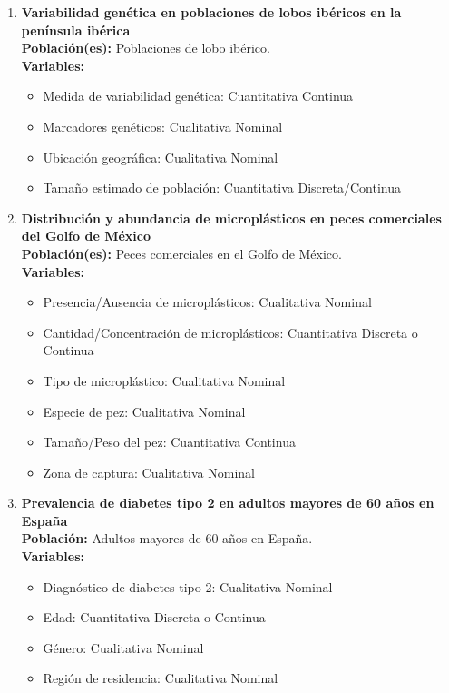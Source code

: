 \documentclass[12pt, letterpaper]{article}
\begin{document}
\begin{enumerate}
\item \textbf{Variabilidad genética en poblaciones de lobos ibéricos en la península ibérica} \\ 
\textbf{Población(es):} Poblaciones de lobo ibérico. \\ 
\textbf{Variables:}
\begin{itemize}
  \item Medida de variabilidad genética: Cuantitativa Continua
  \item Marcadores genéticos: Cualitativa Nominal
  \item Ubicación geográfica: Cualitativa Nominal
  \item Tamaño estimado de población: Cuantitativa Discreta/Continua
\end{itemize}

\item \textbf{Distribución y abundancia de microplásticos en peces comerciales del Golfo de México} \\ 
\textbf{Población(es):} Peces comerciales en el Golfo de México. \\ 
\textbf{Variables:}
\begin{itemize}
  \item Presencia/Ausencia de microplásticos: Cualitativa Nominal
  \item Cantidad/Concentración de microplásticos: Cuantitativa Discreta o Continua
  \item Tipo de microplástico: Cualitativa Nominal
  \item Especie de pez: Cualitativa Nominal
  \item Tamaño/Peso del pez: Cuantitativa Continua
  \item Zona de captura: Cualitativa Nominal
\end{itemize}

\item \textbf{Prevalencia de diabetes tipo 2 en adultos mayores de 60 años en España} \\ 
\textbf{Población:} Adultos mayores de 60 años en España. \\ 
\textbf{Variables:}
\begin{itemize}
  \item Diagnóstico de diabetes tipo 2: Cualitativa Nominal
  \item Edad: Cuantitativa Discreta o Continua
  \item Género: Cualitativa Nominal
  \item Región de residencia: Cualitativa Nominal
\end{itemize}


\end{enumerate}
\end{document}
